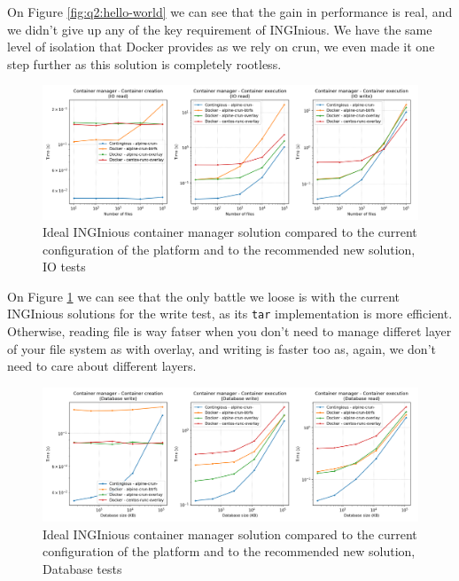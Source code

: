 On Figure \ref{fig:q2:hello-world} we can see that the gain in performance is real, and we didn't give up any of the key requirement of INGInious.  We have the same level of isolation that Docker provides as we rely on crun, we even made it one step further as this solution is completely rootless.

\begin{figure}[h!]
  \begin{center}
    \includegraphics[width=\linewidth]{images/question-2-io.png}
    \caption{Ideal INGInious container manager solution compared to the current configuration of the platform and to the recommended new solution, IO tests}
    \label{fig:q2:io}
  \end{center}
\end{figure}

On Figure \ref{fig:q2:io} we can see that the only battle we loose is with the current INGInious solutions for the write test, as its \texttt{tar} implementation is more efficient.  Otherwise, reading file is way fatser when you don't need to manage differet layer of your file system as with overlay, and writing is faster too as, again, we don't need to care about different layers.

\begin{figure}[h!]
  \begin{center}
    \includegraphics[width=\linewidth]{images/question-2-db.png}
    \caption{Ideal INGInious container manager solution compared to the current configuration of the platform and to the recommended new solution, Database tests}
    \label{fig:q2:db}
  \end{center}
\end{figure}

